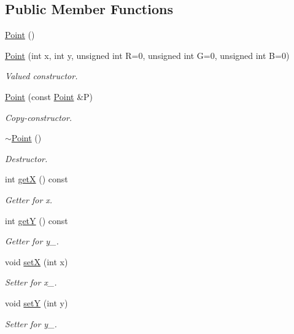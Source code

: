 \subsection*{Public Member Functions}
\begin{DoxyCompactItemize}
\item 
\mbox{\hyperlink{class_point_ad92f2337b839a94ce97dcdb439b4325a}{Point}} ()
\item 
\mbox{\hyperlink{class_point_af6c52ba545e9d933632b6d4edbf86622}{Point}} (int x, int y, unsigned int R=0, unsigned int G=0, unsigned int B=0)
\begin{DoxyCompactList}\small\item\em Valued constructor. \end{DoxyCompactList}\item 
\mbox{\hyperlink{class_point_a7e32c5a7f878c49ed9f1777b622cc06c}{Point}} (const \mbox{\hyperlink{class_point}{Point}} \&P)
\begin{DoxyCompactList}\small\item\em Copy-\/constructor. \end{DoxyCompactList}\item 
\mbox{\hyperlink{class_point_a395fa04b4ec126b66fc053f829a30cc1}{$\sim$\+Point}} ()
\begin{DoxyCompactList}\small\item\em Destructor. \end{DoxyCompactList}\item 
int \mbox{\hyperlink{class_point_ac9d5859db121c7d1b89ca89266dca0a3}{getX}} () const
\begin{DoxyCompactList}\small\item\em Getter for x. \end{DoxyCompactList}\item 
int \mbox{\hyperlink{class_point_a86d10ff46e08462c45b15a8c7ef62d61}{getY}} () const
\begin{DoxyCompactList}\small\item\em Getter for y\+\_\+. \end{DoxyCompactList}\item 
void \mbox{\hyperlink{class_point_acdc86ab607b2ae8415152883e2629015}{setX}} (int x)
\begin{DoxyCompactList}\small\item\em Setter for x\+\_\+. \end{DoxyCompactList}\item 
void \mbox{\hyperlink{class_point_afccad787a359f062efc1af5e935a99ba}{setY}} (int y)
\begin{DoxyCompactList}\small\item\em Setter for y\+\_\+. \end{DoxyCompactList}\item 

\end{DoxyCompactItemize}
